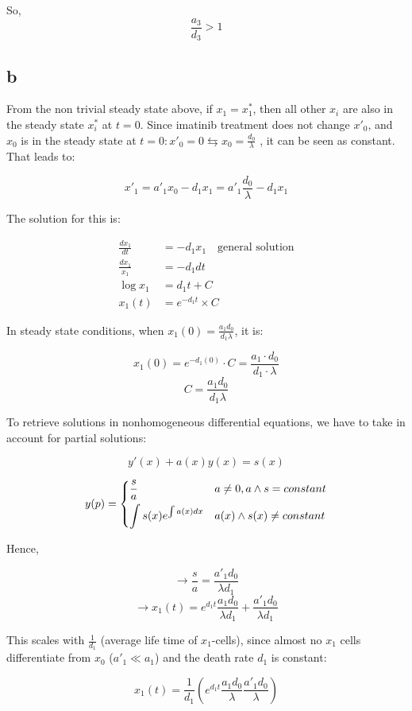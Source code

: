 So, \[\frac{a_3}{d_3}>1\]

\subsection{b}

From the non trivial steady state above, if $x_1 = x^*_1$, then all other $x_i$ are also in the
steady state $x^*_i$ at $t = 0$. Since imatinib treatment does not change $x'_0$, and $x_0$ is in the steady state at  $t = 0 : x'_0 = 0 \leftrightarrows x_0 = \frac{d_0}{\lambda}$ , it can be seen as constant. That leads to:

\[ x'_1 = a'_1x_0 - d_1x_1 = a'_1\frac{d_0}{\lambda} -d_1x_1  \]

The solution for this is: 

\begin{align*}
\frac{dx_1}{dt} &= -d_1x_1 \text{~~~general solution}\\
\frac{dx_1}{x_1} &= -d_1dt \\
\log x_1 &= d_1t+C \\
x_1(t) &= e^{-d_1t}\times C
\end{align*}

In steady state conditions, when $x_1(0) = \frac{a_1d_0}{d_1\lambda}$, it is:

\[ x_1(0) = e^{-d_1(0)} \cdot C = \frac{a_1 \cdot d_0}{ d_1 \cdot \lambda}\]
\[ C = \frac{a_1d_0}{d_1\lambda} \]

To retrieve solutions in nonhomogeneous differential equations, we have to take in account for partial solutions:

\[ y'(x) + a(x)y(x) = s(x) \]


\[
 y(p) = \begin{dcases}
		\frac{s}{a}  & a \neq 0,  a \wedge s = constant\\
		\int s(x) e^{\int a(x)dx} & a(x) \wedge s(x) \neq constant
        \end{dcases}
\]

Hence,

\[ \rightarrow \frac{s}{a} = \frac{a'_1d_0}{\lambda d_1} \]
\[ \rightarrow x_1(t) = e^{d_1t}\frac{a_1d_0}{\lambda d_1} + \frac{a'_1d_0}{\lambda d_1} \]

This scales with $\frac{1}{d_1}$ (average life time of $x_1$-cells), since almost no $x_1$ cells differentiate from $x_0$ ($a'_1 \ll a_1$) and the death rate $d_1$ is constant:

\[ x_1(t) = \frac{1}{d_1} \left(e^{d_1t}\frac{a_1d_0}{\lambda}\frac{a'_1d_0}{\lambda}\right)\]

